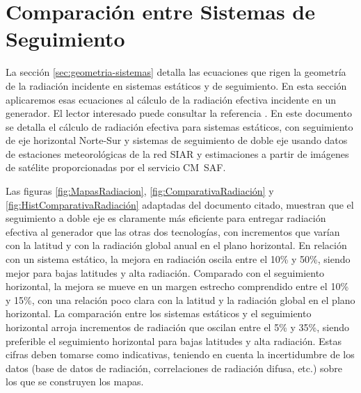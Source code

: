 \section{Comparación entre Sistemas de Seguimiento}
\label{sec:comparacion-sistemas}

La sección \ref{sec:geometria-sistemas} detalla las ecuaciones que
rigen la geometría de la radiación incidente en sistemas estáticos y
de seguimiento. En esta sección aplicaremos esas ecuaciones al cálculo
de la radiación efectiva incidente en un generador. El lector
interesado puede consultar la referencia
\cite{Antonanzas-Torres.Canizares.ea2013}. En este documento se
detalla el cálculo de radiación efectiva para sistemas estáticos, con
seguimiento de eje horizontal Norte-Sur y sistemas de seguimiento de
doble eje usando datos de estaciones meteorológicas de la red
SIAR\cite{SIAR2011} y estimaciones a partir de imágenes de satélite
proporcionadas por el servicio CM~SAF\cite{CMSAF2011}.

Las figuras \ref{fig:MapasRadiacion}, \ref{fig:ComparativaRadiación} y
\ref{fig:HistComparativaRadiación} adaptadas del documento citado,
muestran que el seguimiento a doble eje es claramente más eficiente
para entregar radiación efectiva al generador que las otras dos
tecnologías, con incrementos que varían con la latitud y con la
radiación global anual en el plano horizontal. En relación con un
sistema estático, la mejora en radiación oscila entre el 10\% y 50\%,
siendo mejor para bajas latitudes y alta radiación. Comparado con el
seguimiento horizontal, la mejora se mueve en un margen estrecho
comprendido entre el 10\% y 15\%, con una relación poco clara con la
latitud y la radiación global en el plano horizontal.  La comparación
entre los sistemas estáticos y el seguimiento horizontal arroja
incrementos de radiación que oscilan entre el 5\% y 35\%, siendo
preferible el seguimiento horizontal para bajas latitudes y alta
radiación. Estas cifras deben tomarse como indicativas, teniendo en
cuenta la incertidumbre de los datos (base de datos de radiación,
correlaciones de radiación difusa, etc.) sobre los que se construyen
los mapas.

